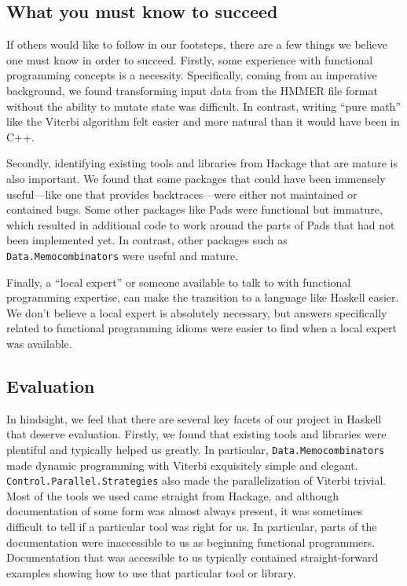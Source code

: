 \documentclass[preprint,nonatbib,blockstyle,nocopyrightspace,times]{sigplanconf}
\begin{document}

\subsection{What you must know to succeed}
If others would like to follow in our footsteps, there are a few
things we believe one must know in order to succeed.
Firstly, some experience with functional programming concepts is a necessity. 
Specifically, coming from an imperative background, we found transforming input data 
from the HMMER file format without the ability to mutate state was difficult.
In contrast, writing ``pure math'' like the Viterbi algorithm felt easier
and more natural than it would have been in C++.

Secondly, identifying existing tools and libraries from Hackage that are mature 
is also important.
We found that some packages that could have been immensely useful---like one 
that provides backtraces---were either not maintained or contained bugs.
Some other packages like Pads were functional but immature, which resulted in 
additional code to work around the parts of Pads that had not been implemented 
yet. 
In contrast, other packages such as \texttt{Data.Memocombinators} were
useful and mature.

Finally, a ``local expert'' or someone available to talk to with functional 
programming expertise, can make the transition to a language like Haskell 
easier.
We don't believe a local expert is absolutely necessary, but answers 
specifically related to functional programming idioms were easier to find when 
a local expert was available.


\subsection{Evaluation}
In hindsight, we feel that there are several key facets of our project in 
Haskell that deserve evaluation.
Firstly, we found that existing tools and libraries were plentiful and 
typically helped us greatly.
In particular, \texttt{Data.Memocombinators} made dynamic 
programming with Viterbi exquisitely simple and elegant.
\texttt{Control.Parallel.Strategies} also made the parallelization of Viterbi trivial.
Most of the tools we used came straight from Hackage, and although 
documentation of some form was almost always present, it was sometimes 
difficult to tell if a particular tool was right for us.
In particular, parts of the documentation were inaccessible to us as beginning 
functional programmers.
Documentation that was accessible to us typically contained straight-forward 
examples showing how to use that particular tool or library.
\end{document}
